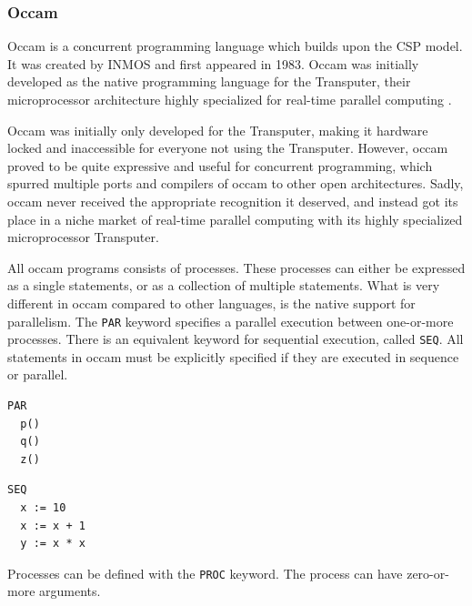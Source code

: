 \subsubsection{Occam}
\label{sssec:occam}

Occam is a concurrent programming language which builds upon the CSP model. It was created by INMOS \citep{occam} and first appeared in 1983. Occam was initially developed as the native programming language for the Transputer, their microprocessor architecture highly specialized for real-time parallel computing \citep{transputer}. 

Occam was initially only developed for the Transputer, making it hardware locked and inaccessible for everyone not using the Transputer. However, occam proved to be quite expressive and useful for concurrent programming, which spurred multiple ports and compilers of occam to other open architectures. Sadly, occam never received the appropriate recognition it deserved, and instead got its place in a niche market of real\hyp{}time parallel computing with its highly specialized microprocessor Transputer. 

All occam programs consists of processes. These processes can either be expressed as a single statements, or as a collection of multiple statements. What is very different in occam compared to other languages, is the native support for parallelism. The \texttt{PAR} keyword specifies a parallel execution between one\hyp{}or\hyp{}more processes. There is an equivalent keyword for sequential execution, called \texttt{SEQ}. All statements in occam must be explicitly specified if they are executed in sequence or parallel. 

\noindent\begin{minipage}{0.45\textwidth}
\begin{lstlisting}[style={CustomC},frame={},numbers={none},xleftmargin={4em}]
PAR
  p()
  q()
  z()
\end{lstlisting}
\end{minipage}
\begin{minipage}{0.45\textwidth}
\begin{lstlisting}[style={CustomC},frame={},numbers={none},xleftmargin={4em}]
SEQ
  x := 10
  x := x + 1
  y := x * x
\end{lstlisting}
\end{minipage}

Processes can be defined with the \texttt{PROC} keyword. The process can have zero\hyp{}or\hyp{}more arguments. 

